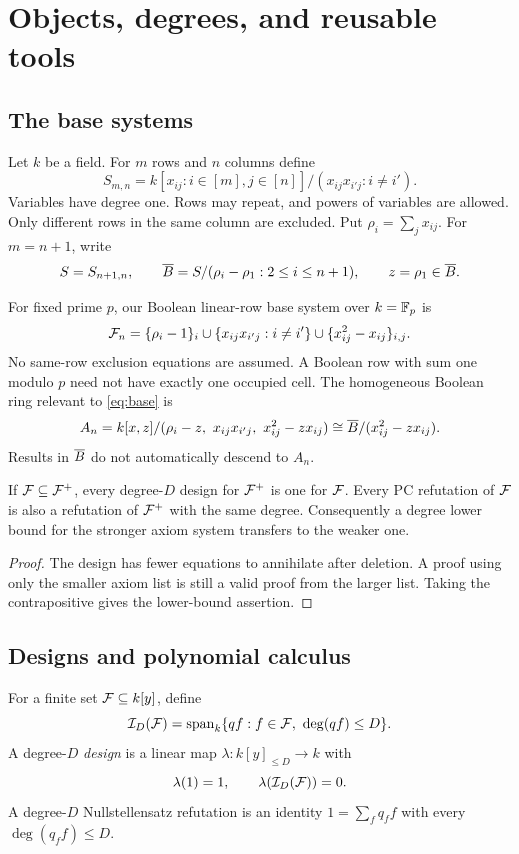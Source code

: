 \chapter{Objects, degrees, and reusable tools}\label{ch:foundations}

\section{The base systems}
Let $k$ be a field. For $m$ rows and $n$ columns define
\[
 S_{m,n}=k[x_{ij}:i\in[m],j\in[n]]/
 (x_{ij}x_{i'j}:i\ne i').
\]
Variables have degree one. Rows may repeat, and powers of variables are allowed. Only different rows in the same column are excluded. Put $\rho_i=\sum_jx_{ij}$. For $m=n+1$, write
\[
 S=S_{n+1,n},\qquad
 \overline B=S/(\rho_i-\rho_1:2\le i\le n+1),\qquad z=\rho_1\in\overline B.
\]

For fixed prime $p$, our Boolean linear-row base system over $k=\mathbb F_p$ is
\begin{equation}\label{eq:base}
 \mathcal F_n=\{\rho_i-1\}_i\cup
 \{x_{ij}x_{i'j}:i\ne i'\}\cup\{x_{ij}^2-x_{ij}\}_{i,j}.
\end{equation}
No same-row exclusion equations are assumed. A Boolean row with sum one modulo $p$ need not have exactly one occupied cell. The homogeneous Boolean ring relevant to \eqref{eq:base} is
\[
 A_n=k[x,z]/(\rho_i-z,\ x_{ij}x_{i'j},\ x_{ij}^2-zx_{ij})
     \cong\BB/(x_{ij}^2-zx_{ij}).
\]
Results in $\overline B$ do not automatically descend to $A_n$.

\begin{lemma}\label{lem:deletion}
If $\mathcal F\subseteq\mathcal F^+$, every degree-$D$ design for $\mathcal F^+$ is one for $\mathcal F$. Every PC refutation of $\mathcal F$ is also a refutation of $\mathcal F^+$ with the same degree. Consequently a degree lower bound for the stronger axiom system transfers to the weaker one.
\end{lemma}
\begin{proof}
The design has fewer equations to annihilate after deletion. A proof using only the smaller axiom list is still a valid proof from the larger list. Taking the contrapositive gives the lower-bound assertion.
\end{proof}

\section{Designs and polynomial calculus}
For a finite set $\mathcal F\subseteq k[y]$, define
\[
 \mathcal I_{D}(\mathcal F)=\operatorname{span}_k\{qf:f\in\mathcal F,\ \deg(qf)\le D\}.
\]
A degree-$D$ \emph{design} is a linear map $\lambda:k[y]_{\le D}\to k$ with
\[
 \lambda(1)=1,\qquad \lambda(\mathcal I_{D}(\mathcal F))=0.
\]
A degree-$D$ Nullstellensatz refutation is an identity
$1=\sum_fq_ff$ with every $\deg(q_ff)\le D$.

